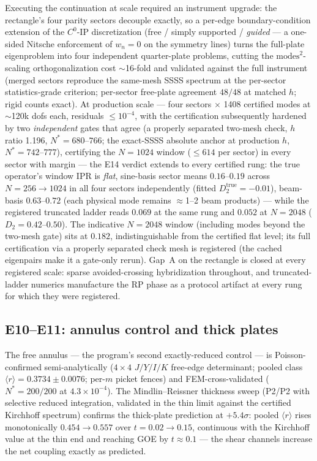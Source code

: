 \documentclass[11pt]{article}
\newcommand{\rmean}{\langle r \rangle}
\begin{document}
Executing the continuation at scale required an instrument upgrade: the
rectangle's four parity sectors decouple exactly, so a per-edge
boundary-condition extension of the $C^0$-IP discretization (free /
simply supported / \emph{guided} --- a one-sided Nitsche enforcement of
$w_n=0$ on the symmetry lines) turns the full-plate eigenproblem into
four independent quarter-plate problems, cutting the
$\mathrm{modes}^2$-scaling orthogonalization cost $\sim$16-fold and
validated against the full instrument (merged sectors reproduce the
same-mesh SSSS spectrum at the per-sector statistics-grade criterion;
per-sector free-plate agreement $48/48$ at matched $h$; rigid counts
exact). At production scale --- four sectors $\times$ 1408 certified
modes at $\sim$120k dofs each, residuals $\le10^{-4}$, with the
certification subsequently hardened by two \emph{independent} gates that
agree (a properly separated two-mesh check, $h$ ratio 1.196,
$N^*=680$--$766$; the exact-SSSS absolute anchor at production $h$,
$N^*=742$--$777$), certifying the $N=1024$ window ($\le614$ per sector)
in every sector with margin --- the E14 verdict extends to every
certified rung: the true
operator's window IPR is \emph{flat}, sine-basis sector means
$0.16$--$0.19$ across $N=256\to1024$ in all four sectors independently
(fitted $D_2^{\mathrm{true}}=-0.01$), beam-basis $0.63$--$0.72$ (each
physical mode remains $\approx$1--2 beam products) --- while the
registered truncated ladder reads $0.069$ at the same rung and $0.052$
at $N=2048$ ($D_2=0.42$--$0.50$). The indicative $N=2048$ window
(including modes beyond the two-mesh gate) sits at $0.182$,
indistinguishable from the certified flat level; its full certification
via a properly separated check mesh is registered (the cached eigenpairs
make it a gate-only rerun). Gap~A on the rectangle is closed at every
registered scale: sparse avoided-crossing hybridization throughout, and
truncated-ladder numerics manufacture the RP phase as a protocol
artifact at every rung for which they were registered.

\subsection{E10--E11: annulus control and thick plates}

The free annulus --- the program's second exactly-reduced control --- is
Poisson-confirmed semi-analytically ($4\times4$ $J/Y/I/K$ free-edge
determinant; pooled class $\rmean=0.3734\pm0.0076$; per-$m$ picket fences)
and FEM-cross-validated ($N^*=200/200$ at $4.3\times10^{-4}$). The
Mindlin--Reissner thickness sweep (P2/P2 with selective reduced integration,
validated in the thin limit against the certified Kirchhoff spectrum)
confirms the thick-plate prediction at $+5.4\sigma$: pooled $\rmean$ rises
monotonically $0.454\to0.557$ over $t=0.02\to0.15$, continuous with the
Kirchhoff value at the thin end and reaching GOE by $t\approx0.1$ --- the
shear channels increase the net coupling exactly as predicted.
\end{document}
